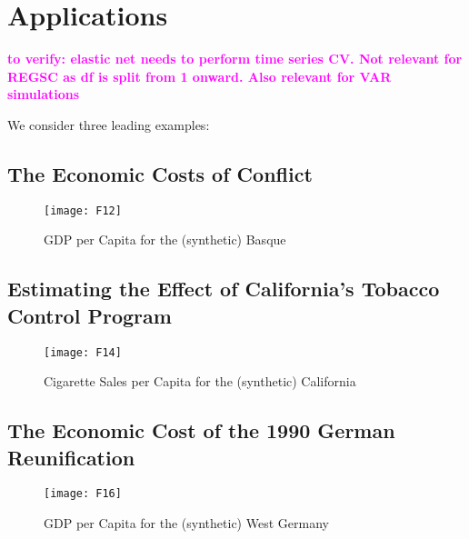 \section{Applications}

\textcolor{magenta}{\textbf{to verify: elastic net needs to perform time series CV. Not relevant for REGSC as df is split  from 1 onward. Also relevant for VAR simulations}}
 
We consider three leading examples:


\subsection{The Economic Costs of Conflict}
\cite{abadie:2003}
\begin{figure}[H]
	\centering
	\texttt{[image: F12]}
	\caption{GDP per Capita for the (synthetic) Basque}
	\label{F_03}
\end{figure}

\newpage
\subsection{Estimating the Effect of California’s Tobacco Control Program}
\cite{abadie:2010}
\begin{figure}[H]
	\centering
	\texttt{[image: F14]}
	\caption{Cigarette Sales per Capita for the (synthetic) California}
	\label{F_04}
\end{figure}

\newpage
\subsection{The Economic Cost of the 1990 German Reunification}
\cite{abadie:2015}
\begin{figure}[H]
	\centering
	\texttt{[image: F16]}
	\caption{GDP per Capita for the (synthetic) West Germany}
	\label{F_05}
\end{figure}
